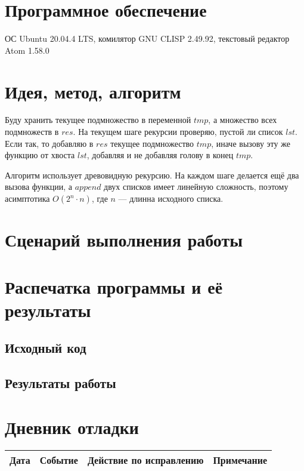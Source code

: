 \documentclass[12pt]{article}
\begin{document}
\section{Программное обеспечение}
ОС Ubuntu 20.04.4 LTS, комилятор GNU CLISP 2.49.92, текстовый редактор Atom 1.58.0

\pagebreak
\section{Идея, метод, алгоритм}
Буду хранить текущее подмножество в переменной $tmp$, а множество всех подмножеств в $res$. На текущем шаге рекурсии проверяю, пустой ли список $lst$. Если так, то добавляю в $res$ текущее подмножество $tmp$, иначе вызову эту же функцию от хвоста $lst$, добавляя и не добавляя голову в конец $tmp$.

Алгоритм использует древовидную рекурсию. На каждом шаге делается ещё два вызова функции, а $append$ двух списков имеет линейную сложность, поэтому асимптотика $O(2 ^ n \cdot n)$, где $n$ --- длинна исходного списка.

\section{Сценарий выполнения работы}

\section{Распечатка программы и её результаты}

\subsection{Исходный код}


\pagebreak
\subsection{Результаты работы}


\pagebreak
\section{Дневник отладки}
\begin{tabular}{|p{50pt}|p{80pt}|p{140pt}|p{140pt}|}
\hline
Дата & Событие & Действие по исправлению & Примечание \\
\hline
\end{tabular}
\end{document}
